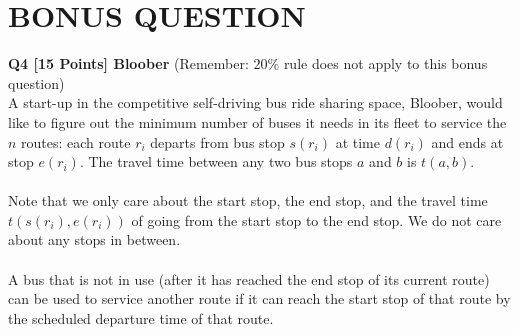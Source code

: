 \documentclass[10pt]{article}
\begin{document}
\section*{BONUS QUESTION}
{\fontsize{13}{14} \selectfont \textbf{Q4 [15 Points] Bloober}  (Remember: $20\%$ rule does not apply to this bonus question)}\\
A start-up in the competitive self-driving bus ride sharing space, Bloober, would like to figure out the minimum number of buses it needs in its fleet to service the $n$ routes: each route $r_i$ departs from bus stop $s(r_i)$ at time $d(r_i)$ and ends at stop $e(r_i)$. The travel time between any two bus stops $a$ and $b$ is $t(a, b)$.\\
\\
Note that we only care about the start stop, the end stop, and the travel time $t(s(r_i), e(r_i))$ of going from the start stop to the end stop. We do not care about any stops in between.\\
\\
A bus that is not in use (after it has reached the end stop of its current route) can be used to service another route if it can reach the start stop of that route by the scheduled departure time of that route.
\end{document}
